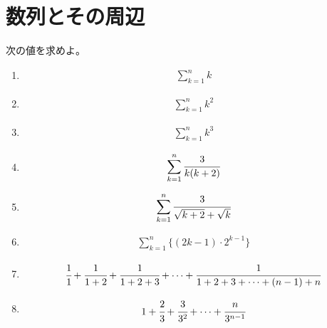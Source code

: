 \documentclass[autodetect-engine,ja=standard, 10.5pt, a4paper, titlepage]{bxjsarticle}
\begin{document}
\section*{数列とその周辺}
\noindent 次の値を求めよ。
\begin{enumerate}[1.]
  \item
    \begin{fleqn}[20pt]
      \begin{align*}\label{}
        \sum_{k=1}^{n}k
      \end{align*}
    \end{fleqn}
  \item
    \begin{fleqn}[20pt]
      \begin{align*}\label{}
        \sum_{k=1}^{n}k^2
      \end{align*}
    \end{fleqn}
  \item
    \begin{fleqn}[20pt]
      \begin{align*}
        \sum_{k=1}^{n}k^3
      \end{align*}
    \end{fleqn}
  \item
    \begin{fleqn}[20pt]
      \begin{align*}
        \sum_{k=1}^{n}\cfrac{3}{k(k+2)}
      \end{align*}
    \end{fleqn}
  \item
    \begin{fleqn}[20pt]
      \begin{align*}
        \sum_{k=1}^{n}\cfrac{3}{\sqrt{k+2} + \sqrt{k}}
      \end{align*}
    \end{fleqn}
  \item
    \begin{fleqn}[20pt]
      \begin{align*}
        \sum_{k=1}^{n}\{(2k-1)\cdot 2^{k-1}\}
      \end{align*}
    \end{fleqn}
  \item
    \begin{fleqn}[20pt]
      \begin{align*}
        \cfrac{1}{1} + \cfrac{1}{1+2} + \cfrac{1}{1+2+3} + \cdots + \cfrac{1}{1+2+3+\cdots +(n-1)+n}
      \end{align*}
    \end{fleqn}
  \item
    \begin{fleqn}[20pt]
      \begin{align*}
        1+\cfrac{2}{3}+\cfrac{3}{3^2}+\cdots+\cfrac{n}{3^{n-1}}
      \end{align*}
    \end{fleqn}
\end{enumerate}
\end{document}

